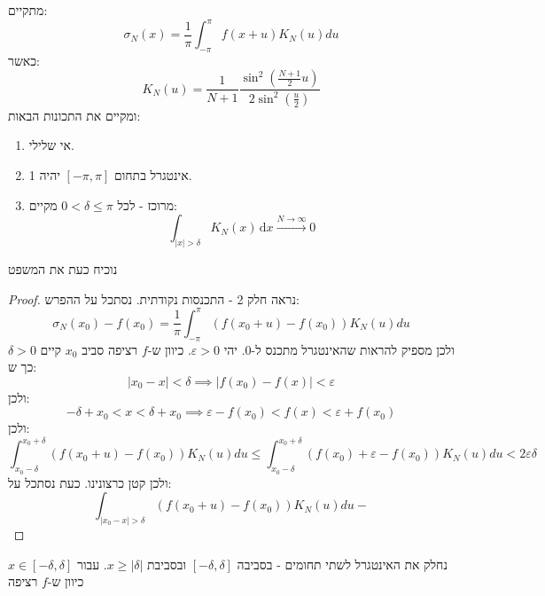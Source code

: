 \documentclass{tstextbook}
\begin{document}
\begin{lemma}
מתקיים:
$$\sigma_{N}(x)=\frac{1}{\pi}\int_{-\pi}^{\pi}f(x+u)K_{N}(u)d u$$
כאשר:
$$K_{N}(u)={\frac{1}{N+1}}{\frac{\sin^{2}\left({\frac{N+1}{2}}u\right)}{2\sin^{2}\left({\frac{u}{2}}\right)}}$$
ומקיים את התכונות הבאות:

  \begin{enumerate}
    \item אי שלילי. 


    \item אינטגרל בתחום \([-\pi,\pi]\) יהיה 1. 


    \item מרוכז - לכל \(0<\delta\leq \pi\) מקיים: 
$$\int_{|x|>\delta} K_{N}(x)  \, \mathrm{d}x \xrightarrow{N\to \infty} 0$$


  \end{enumerate}
\end{lemma}
נוכיח כעת את המשפט

\begin{proof}
נראה חלק 2 - התכנסות נקודתית. נסתכל על ההפרש:
$$\sigma_{N}(x_{0})-f(x_{0})=\frac{1}{\pi}\int_{-\pi}^{\pi}(f(x_{0}+u)-f(x_{0}))K_{N}(u)d u$$
ולכן מספיק להראות שהאינטגרל מתכנס ל-0. יהי \(\varepsilon> 0\). כיוון ש-\(f\) רציפה סביב \(x_{0}\)  קיים \(\delta> 0\) כך ש:
$$\lvert x_{0}-x \rvert <\delta\implies \lvert f(x_{0})-f(x) \rvert <\varepsilon$$
ולכן:
$$-\delta+x_{0}<x<\delta+x_{0}\implies \varepsilon -f(x_{0})<f(x)<\varepsilon+f(x_{0})$$
ולכן:
$$\int_{x_{0}-\delta}^{x_{0}+\delta}(f(x_{0}+u)-f(x_{0}))K_{N}(u)d u\leq \int_{x_{0}-\delta}^{x_{0}+\delta}(f(x_{0})+\varepsilon-f(x_{0}))K_{N}(u)d u<2\varepsilon \delta$$
ולכן קטן כרצונינו. כעת נסתכל על:
$$\int_{|x_{0}-x|>\delta}(f(x_{0}+u)-f(x_{0}))K_{N}(u)d u-$$

\end{proof}
נחלק את האינטגרל לשתי תחומים - בסביבה \([-\delta,\delta]\) ובסביבת \(x\geq|\delta|\). עבור \(x \in [-\delta,\delta]\) כיוון ש-\(f\) רציפה
\end{document}
